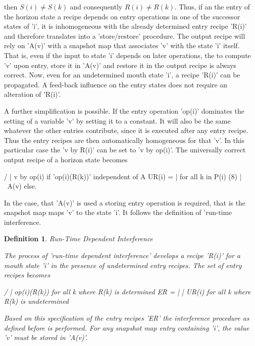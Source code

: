 \documentclass[12pt]{article}
\newtheorem{definition}{Definition}
\begin{document}
then \(S(i) \neq S(k)\) and consequently \(R(i) \neq R(k)\). Thus, if an the entry of
the horizon state a recipe depends on entry operations in one of the successor
states of 'i', it is inhomogeneous with the already determined entry recipe
'R(i)' and therefore translates into a 'store/restore' procedure. The output
recipe will rely on 'A(v)' with a snapshot map that associates 'v' with the
state 'i' itself. That is, even if the input to state 'i' depends on later
operations, the to compute 'v' upon entry, store it in 'A(v)' and restore it in
the output recipe is always correct. Now, even for an undetermined mouth state
'i', a recipe 'R(i)' can be propagated.  A feed-back influence on the entry
states does not require an alteration of 'R(i)'.

A further simplification is possible. If the entry operation 'op(i)' dominates
the setting of a variable 'v' by setting it to a constant.  It will also be the
same whatever the other entries contribute, since it is executed after any
entry recipe. Thus the entry recipes are then automatically homogeneous for
that 'v'. In this particular case the 'v by R(i)' can be set to 'v by op(i)'.
The universally correct output recipe of a horizon state becomes 

                  /
                  |   v by op(i)    if 'op(i)(R(k))' independent of A
          UR(i) = |                     for all k in P(i)                   (8)
                  |
                  \   A(v)          else.

In the case, that 'A(v)' is used a storing entry operation is required, that is
the snapshot map maps 'v' to the state 'i'. It follows the definition of
'run-time interference.

\begin{definition}
Run-Time Dependent Interference

    The process of 'run-time dependent interference' develops a recipe 'R(i)'
    for a mouth state 'i' in the presence of undetermined entry recipes. The
    set of entry recipes becomes

            /
            |   op(i)(R(k))  for all k where R(k) is determined
       ER = | 
            |   UR(i)        for all k where R(k) is undetermined
            \             

    Based on this specification of the entry recipes 'ER' the interference
    procedure as defined before is performed. For any snapshot map entry
    containing 'i', the value 'v' must be stored in 'A(v)'.
\end{definition}
\end{document}
